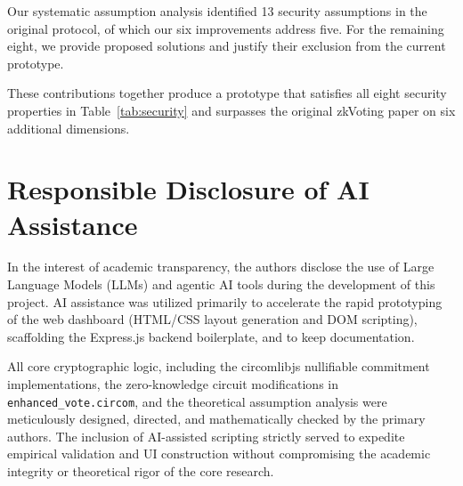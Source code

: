 \documentclass[conference]{IEEEtran}
\begin{document}
Our systematic assumption analysis identified 13 security assumptions in the
original protocol, of which our six improvements address five.  For the
remaining eight, we provide proposed solutions and justify their exclusion
from the current prototype.

These contributions together produce a prototype that satisfies all eight
security properties in Table~\ref{tab:security} and surpasses the original
zkVoting paper on six additional dimensions.

\section*{Responsible Disclosure of AI Assistance}
\label{sec:disclosure}

In the interest of academic transparency, the authors disclose the use of
Large Language Models (LLMs) and agentic AI tools during the development
of this project. AI assistance was utilized primarily to accelerate the
rapid prototyping of the web dashboard (HTML/CSS layout generation and DOM
scripting), scaffolding the Express.js backend boilerplate, and to keep documentation.

All core cryptographic logic, including the circomlibjs nullifiable
commitment implementations, the zero-knowledge circuit modifications
in \texttt{enhanced\_vote.circom}, and the theoretical assumption analysis
were meticulously designed, directed, and mathematically checked by the primary
authors. The inclusion of AI-assisted scripting strictly served to expedite
empirical validation and UI construction without compromising the academic
integrity or theoretical rigor of the core research.
\end{document}
